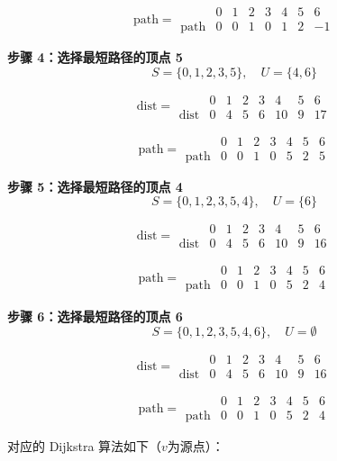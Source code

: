 \documentclass[lang=cn,newtx,10pt,scheme=chinese]{../elegantbook}
\begin{document}
\[
\text{path} =
\begin{array}{c|ccccccc}
 & 0 & 1 & 2 & 3 & 4 & 5 & 6 \\ \hline
\text{path} & 0 & 0 & 1 & 0 & 1 & 2 & -1
\end{array}
\]

\textbf{步骤 4：选择最短路径的顶点 5}
\[
S = \{0,1,2,3,5\}, \quad U = \{4, 6\}
\]

\[
\text{dist} =
\begin{array}{c|ccccccc}
 & 0 & 1 & 2 & 3 & 4 & 5 & 6 \\ \hline
\text{dist} & 0 & 4 & 5 & 6 & 10 & 9 & 17
\end{array}
\]

\[
\text{path} =
\begin{array}{c|ccccccc}
 & 0 & 1 & 2 & 3 & 4 & 5 & 6 \\ \hline
\text{path} & 0 & 0 & 1 & 0 & 5 & 2 & 5
\end{array}
\]

\textbf{步骤 5：选择最短路径的顶点 4}
\[
S = \{0,1,2,3,5,4\}, \quad U = \{6\}
\]

\[
\text{dist} =
\begin{array}{c|ccccccc}
 & 0 & 1 & 2 & 3 & 4 & 5 & 6 \\ \hline
\text{dist} & 0 & 4 & 5 & 6 & 10 & 9 & 16
\end{array}
\]

\[
\text{path} =
\begin{array}{c|ccccccc}
 & 0 & 1 & 2 & 3 & 4 & 5 & 6 \\ \hline
\text{path} & 0 & 0 & 1 & 0 & 5 & 2 & 4
\end{array}
\]

\textbf{步骤 6：选择最短路径的顶点 6}
\[
S = \{0,1,2,3,5,4,6\}, \quad U = \emptyset
\]

\[
\text{dist} =
\begin{array}{c|ccccccc}
 & 0 & 1 & 2 & 3 & 4 & 5 & 6 \\ \hline
\text{dist} & 0 & 4 & 5 & 6 & 10 & 9 & 16
\end{array}
\]

\[
\text{path} =
\begin{array}{c|ccccccc}
 & 0 & 1 & 2 & 3 & 4 & 5 & 6 \\ \hline
\text{path} & 0 & 0 & 1 & 0 & 5 & 2 & 4
\end{array}
\]

对应的 Dijkstra 算法如下（$v$为源点）：
\end{document}
